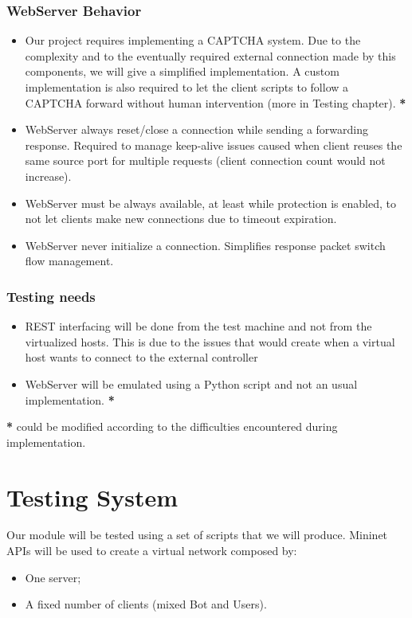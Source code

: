 \subsubsection{WebServer Behavior}
\begin{itemize}
	\item Our project requires implementing a CAPTCHA system. Due to the complexity and to the eventually required external connection made by this components, we will give a simplified implementation. A custom implementation is also required to let the client scripts to follow a CAPTCHA forward without human intervention (more in Testing chapter). \textbf{*}
	\item WebServer always reset/close a connection while sending a forwarding response. Required to manage keep-alive issues caused when client reuses the same source port for multiple requests (client connection count would not increase).
	\item WebServer must be always available, at least while protection is enabled, to not let clients make new connections due to timeout expiration.
	\item WebServer never initialize a connection. Simplifies response packet switch flow management.
\end{itemize}

\subsubsection{Testing needs}
\begin{itemize}
	\item REST interfacing will be done from the test machine and not from the virtualized hosts. This is due to the issues that would create when a virtual host wants to connect to the external controller
	\item WebServer will be emulated using a Python script and not an usual implementation. \textbf{*}
\end{itemize}

\textbf{*} could be modified according to the difficulties encountered during implementation.

\section{Testing System}
Our module will be tested using a set of scripts that we will produce. Mininet APIs will be used to create a virtual network composed by:
\begin{itemize}
	\item One server;
	\item A fixed number of clients (mixed Bot and Users).
\end{itemize}

